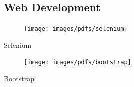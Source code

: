 \begin{aside}
    \subsection{Web Development}
      \begin{center}
        \vspace{2mm}%
        \begin{minipage}[t]{12mm}
          \begin{center}
            \begin{figure}
              \texttt{[image: images/pdfs/selenium]}
            \end{figure}
            \small{Selenium}
          \end{center}
        \end{minipage}\hspace{2.8mm}%
        \vspace{2mm}%
        \begin{minipage}[t]{12mm}
          \begin{center}
            \begin{figure}
              \texttt{[image: images/pdfs/bootstrap]}
            \end{figure}
            \small{Bootstrap}
          \end{center}
        \end{minipage}%
      \end{center}
\end{aside}
